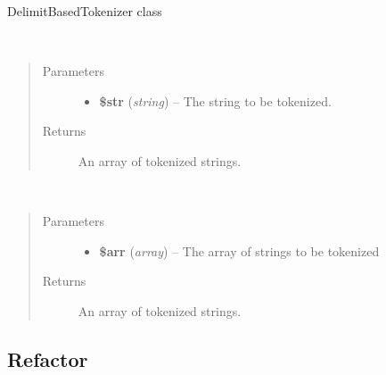 \documentclass[letterpaper,10pt,english]{sphinxmanual}
\begin{document}
\begin{fulllineitems}
DelimitBasedTokenizer class

\begin{fulllineitems}
~\begin{quote}\begin{description}
\item[{Parameters}] \leavevmode\begin{itemize}
\item {} 
\textbf{\$str} (\emph{string}) -- The string to be tokenized.

\end{itemize}

\item[{Returns}] \leavevmode
An array of tokenized strings.

\end{description}\end{quote}

\end{fulllineitems}


\begin{fulllineitems}
~\begin{quote}\begin{description}
\item[{Parameters}] \leavevmode\begin{itemize}
\item {} 
\textbf{\$arr} (\emph{array}) -- The array of strings to be tokenized

\end{itemize}

\item[{Returns}] \leavevmode
An array of tokenized strings.

\end{description}\end{quote}

\end{fulllineitems}


\end{fulllineitems}



\subsection{Refactor}
\label{docs/api:refactor}
\end{document}
